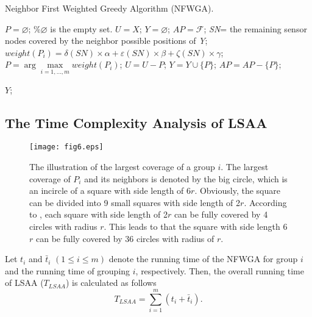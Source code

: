 \documentclass[journal]{IEEEtran}
\begin{document}
\begin{algorithm}[htb]         \caption{Neighbor First Weighted Greedy Algorithm (NFWGA).}             
\label{NFWGA}                  
\begin{algorithmic}[1]                
\STATE $P=\varnothing$; \%$\varnothing$ is the empty set.
\STATE $U=X$;
\STATE $Y=\varnothing$;
\STATE $AP=\mathcal{F}$;
\STATE \emph{SN}= the remaining sensor nodes covered by the neighbor possible positions of \emph{Y};
\STATE $weight(P_i)=\delta(SN)\times\alpha+\varepsilon(SN)\times\beta+\zeta(SN)\times\gamma$;
\ENDFOR
\STATE $P=\arg{\max\limits_{i=1,\ldots,m}weight(P_i)}$;
\STATE $U=U-P$;
\STATE $Y=Y\cup \{P\}$;
\STATE $AP=AP-\{P\}$;
\ENDWHILE

\RETURN $Y$;                
\end{algorithmic}

\end{algorithm}

\subsection{The Time Complexity Analysis of LSAA}

\begin{figure}
\begin{center}
\texttt{[image: fig6.eps]}    \caption{The illustration of the largest coverage of a group $i$. The largest coverage of $P_i$ and its neighbors is denoted by the big circle, which is an incircle of a square with side length of 6$r$. Obviously, the square can be divided into 9 small squares with side length of 2$r$. According to \cite{Hochbaum85} \cite{Tang06}, each square with side length of 2$r$ can be fully covered by 4 circles with radius $r$. This leads to that the square with side length 6$r$ can be fully covered by 36 circles with radius of $r$.}
\label{fig6}                                 \end{center}                                 \end{figure}

Let $t_i$ and $\bar{t}_i$ $(1\leq i \leq m)$ denote the running time of the NFWGA for group $i$ and the running time of grouping $i$, respectively. Then, the overall running time of LSAA ($T_{LSAA}$) is calculated as follows
\begin{equation}\label{equ15}
{T_{LSAA}} = \sum\limits_{i = 1}^m {\left( {{t_i} + {{\bar t}_i}} \right)} .
\end{equation}
\end{document}
